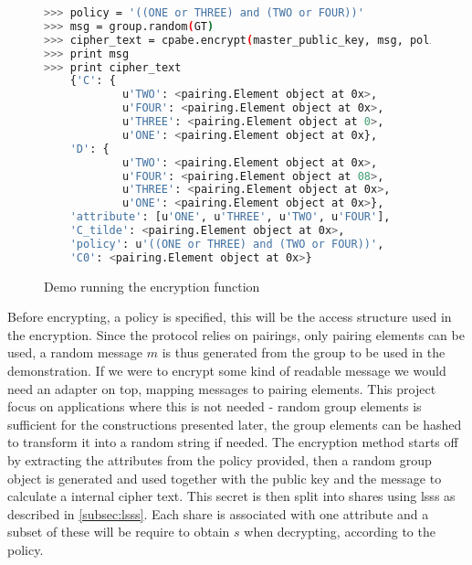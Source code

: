 \begin{figure}[]
\begin{lstlisting}[language=bash, frame=single, breaklines=true ]
>>> policy = '((ONE or THREE) and (TWO or FOUR))'
>>> msg = group.random(GT)
>>> cipher_text = cpabe.encrypt(master_public_key, msg, policy)
>>> print msg
>>> print cipher_text
    {'C': {
            u'TWO': <pairing.Element object at 0x>, 
            u'FOUR': <pairing.Element object at 0x>, 
            u'THREE': <pairing.Element object at 0>, 
            u'ONE': <pairing.Element object at 0x}, 
    'D': {
            u'TWO': <pairing.Element object at 0x>, 
            u'FOUR': <pairing.Element object at 08>, 
            u'THREE': <pairing.Element object at 0x>, 
            u'ONE': <pairing.Element object at 0x>}, 
    'attribute': [u'ONE', u'THREE', u'TWO', u'FOUR'], 
    'C_tilde': <pairing.Element object at 0x>, 
    'policy': u'((ONE or THREE) and (TWO or FOUR))', 
    'C0': <pairing.Element object at 0x>}
\end{lstlisting}  
\caption{Demo running the encryption function}
\label{fig:encfunc} 
\end{figure}


Before encrypting, a policy is specified, this will be the access structure used in the encryption. Since the protocol relies on pairings, only pairing elements can be used, a random message $m$ is thus generated from the group to be used in the demonstration. If we were to encrypt some kind of readable message we would need an adapter on top, mapping messages to pairing elements. This project focus on applications where this is not needed - random group elements is sufficient for the constructions presented later, the group elements can be hashed to transform it into a random string if needed. The encryption method starts off by extracting the attributes from the policy provided, then a random group object is generated and used together with the public key and the message to calculate a internal cipher text. This secret is then split into shares using \gls{lsss} as described in \ref{subsec:lsss}. Each share is associated with one attribute and a subset of these will be require to obtain $s$ when decrypting, according to the policy.


\clearpage 
